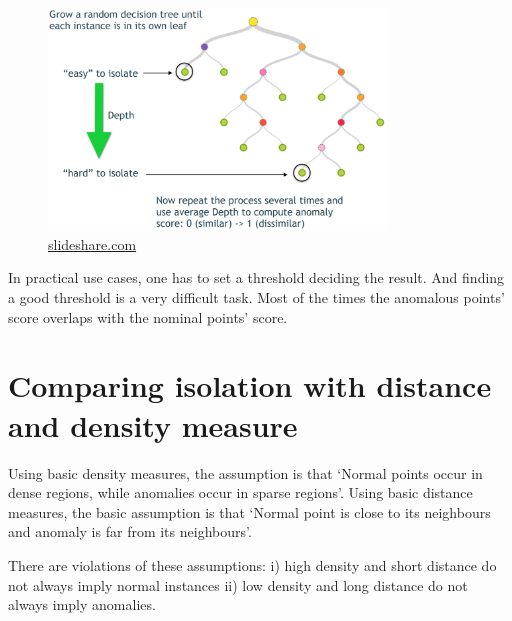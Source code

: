 \vspace{1em}
\begin{figure}[!ht]
    \centering
    \includegraphics[width=0.80\textwidth]{../fig/chapter2/iforest-visualization.png}
    {\href{https://www.slideshare.net/mlvlc/l14-anomaly-detection}{slideshare.com}}
    \label{fig:iforest-visualization}
\end{figure}

In practical use cases, one has to set a threshold deciding the result.
And finding a good threshold is a very difficult task.
Most of the times the anomalous points' score overlaps with the nominal points' score.

\section{Comparing isolation with distance and density measure}
\label{sec:isolation-vs-distance-density}

Using basic density measures, the assumption is that ‘Normal points occur in dense regions, while anomalies occur in sparse regions’.
Using basic distance measures, the basic assumption is that ‘Normal point is close to its neighbours and anomaly is far from its neighbours’.

There are violations of these assumptions: i) high density and short distance do not always imply normal instances ii) low density and long distance do not always imply anomalies.

